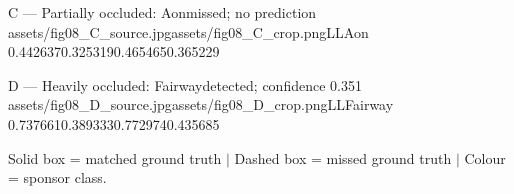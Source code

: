 \vspace{2mm}

\begin{minipage}[t]{0.495\linewidth}
\lloccMissPanel
  {C --- Partially occluded: Aon}{missed; no prediction}
  {assets/fig08_C_source.jpg}{assets/fig08_C_crop.png}{LLAon}
  {0.442637}{0.325319}{0.465465}{0.365229}
\end{minipage}\hfill
\begin{minipage}[t]{0.495\linewidth}
\lloccPanel
  {D --- Heavily occluded: Fairway}{detected; confidence 0.351}
  {assets/fig08_D_source.jpg}{assets/fig08_D_crop.png}{LLFairway}
  {0.737661}{0.389333}{0.772974}{0.435685}
\end{minipage}

\vspace{1mm}
{\tiny\color{LLMuted}
Solid box = matched ground truth \quad$\mid$\quad
Dashed box = missed ground truth \quad$\mid$\quad
Colour = sponsor class.}
